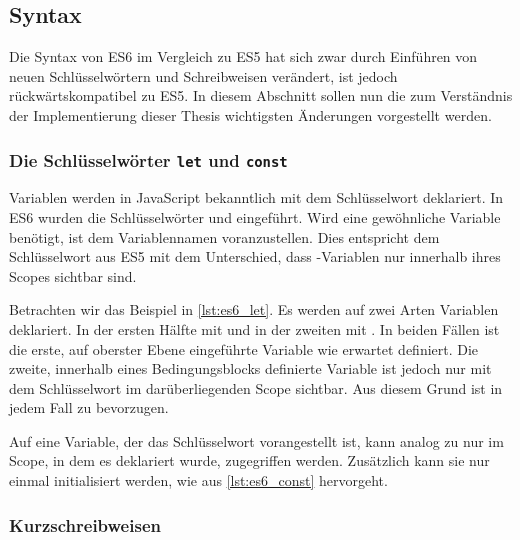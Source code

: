 \subsection{Syntax}
\label{ssec:ge_syntax}

Die Syntax von ES6 im Vergleich zu ES5 hat sich zwar durch Einführen von neuen
Schlüsselwörtern und Schreibweisen verändert, ist jedoch rückwärtskompatibel zu
ES5.  In diesem Abschnitt sollen nun die zum Verständnis der Implementierung
dieser Thesis wichtigsten Änderungen vorgestellt werden.

\subsubsection{Die Schlüsselwörter \texttt{let} und \texttt{const}}
\label{sssec:ges_let_und_const}

Variablen werden in JavaScript bekanntlich mit dem Schlüsselwort 
deklariert.  In ES6 wurden die Schlüsselwörter  und  eingeführt.
Wird eine gewöhnliche Variable benötigt, ist  dem Variablennamen
voranzustellen.  Dies entspricht dem Schlüsselwort  aus ES5 mit dem
Unterschied, dass -Variablen nur innerhalb ihres Scopes sichtbar
sind.

Betrachten wir das Beispiel in \cref{lst:es6_let}.  Es werden auf zwei Arten
Variablen deklariert.  In der ersten Hälfte mit  und in der zweiten mit
.  In beiden Fällen ist die erste, auf oberster Ebene eingeführte
Variable wie erwartet definiert.  Die zweite, innerhalb eines Bedingungsblocks
definierte Variable ist jedoch nur mit dem Schlüsselwort  im
darüberliegenden Scope sichtbar.  Aus diesem Grund ist   in
jedem Fall zu bevorzugen.



Auf eine Variable, der das Schlüsselwort  vorangestellt ist, kann
analog zu  nur im Scope, in dem es deklariert wurde, zugegriffen
werden.  Zusätzlich kann sie nur einmal initialisiert werden, wie aus
\cref{lst:es6_const} hervorgeht.



\subsubsection{Kurzschreibweisen}
\label{sssec:ges_kurzschreibweisen}

